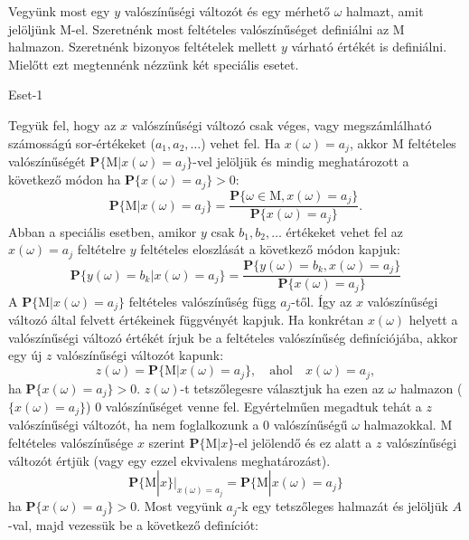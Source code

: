 \documentclass{article}
\begin{document}
Vegyünk most egy $y$ valószínűségi változót és egy mérhető $\omega$ halmazt, amit jelöljünk $\mathrm{M}$-el. Szeretnénk most feltételes valószínűséget definiálni az $\mathrm{M}$ halmazon. Szeretnénk bizonyos feltételek mellett $y$ várható értékét is definiálni. Mielőtt ezt megtennénk nézzünk két speciális esetet.
\begin{description}
	\item[Eset-1] 
\end{description}
Tegyük fel, hogy az $x$ valószínűségi változó csak véges, vagy megszámlálható számosságú sor-értékeket ($a_1,a_2,\ldots$) vehet fel. Ha $x(\omega) = a_j$, akkor $\mathrm{M}$ feltételes valószínűségét $\mathbf{P}\{\mathrm{M}|x(\omega) = a_j\}$-vel jelöljük és mindig meghatározott a következő módon ha $\mathbf{P}\{x(\omega) = a_j\} > 0$:
\begin{equation}
	\mathbf{P}\{\mathrm{M}|x(\omega) = a_j\} = \frac{\mathbf{P}\{\omega \in \mathrm{M}, x(\omega) = a_j\}}{\mathbf{P}\{x(\omega) = a_j\}}.
\end{equation}
Abban a speciális esetben, amikor $y$ csak $b_1,b_2,\ldots$ értékeket vehet fel az $x(\omega) = a_j$ feltételre $y$ feltételes eloszlását a következő módon kapjuk:
\begin{equation}
	\mathbf{P}\{y(\omega) = b_k |x(\omega) = a_j\} = \frac{\mathbf{P}\{y(\omega) = b_k, x(\omega) = a_j\}}{\mathbf{P}\{x(\omega) = a_j\}}
\end{equation}
A $\mathbf{P}\{\mathrm{M}|x(\omega) = a_j\}$ feltételes valószínűség függ $a_j$-től. Így az $x$ valószínűségi változó által felvett értékeinek függvényét kapjuk. Ha konkrétan $x(\omega)$ helyett a valószínűségi változó értékét írjuk be a feltételes valószínűség definíciójába, akkor egy új $z$ valószínűségi változót kapunk:
\[
 z(\omega) = \mathbf{P}\{\mathrm{M}|x(\omega) = a_j\},\quad \mathrm{ahol} \quad x(\omega) = a_j,
\]
ha $\mathbf{P}\{x(\omega) = a_j\} > 0$. $z(\omega)$-t tetszőlegesre választjuk ha ezen az $\omega$ halmazon ($\{x(\omega) = a_j\}$) $0$ valószínűséget venne fel. Egyértelműen megadtuk tehát a $z$ valószínűségi változót, ha nem foglalkozunk a $0$ valószínűségű $\omega$ halmazokkal. $\mathrm{M}$ feltételes valószínűsége $x$ szerint $\mathbf{P}\{\mathrm{M}|x\}$-el jelölendő és ez alatt a $z$ valószínűségi változót értjük (vagy egy ezzel ekvivalens meghatározást). 
\begin{equation}
	\mathbf{P}\{\mathrm{M}|x\} {|}_{x(\omega) = a_j} = \mathbf{P}\{\mathrm{M}|x(\omega) = a_j\}
\end{equation}
ha $\mathbf{P}\{x(\omega) = a_j\} > 0$. Most vegyünk $a_j$-k egy tetszőleges halmazát és jelöljük $A$-val, majd vezessük be a következő definíciót:
\end{document}
